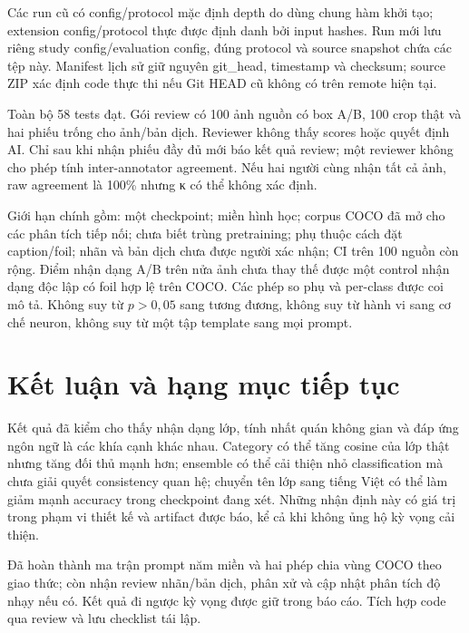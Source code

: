 \documentclass[11pt,a4paper]{article}
\begin{document}
Các run cũ có config/protocol mặc định depth do dùng chung hàm khởi tạo; extension config/protocol thực được định danh bởi input hashes. Run mới lưu riêng study config/evaluation config, đúng protocol và source snapshot chứa các tệp này. Manifest lịch sử giữ nguyên git\_head, timestamp và checksum; source ZIP xác định code thực thi nếu Git HEAD cũ không có trên remote hiện tại.

Toàn bộ 58 tests đạt. Gói review có 100 ảnh nguồn có box A/B, 100 crop thật và hai phiếu trống cho ảnh/bản dịch. Reviewer không thấy scores hoặc quyết định AI. Chỉ sau khi nhận phiếu đầy đủ mới báo kết quả review; một reviewer không cho phép tính inter-annotator agreement. Nếu hai người cùng nhận tất cả ảnh, raw agreement là 100\% nhưng κ có thể không xác định.

Giới hạn chính gồm: một checkpoint; miền hình học; corpus COCO đã mở cho các phân tích tiếp nối; chưa biết trùng pretraining; phụ thuộc cách đặt caption/foil; nhãn và bản dịch chưa được người xác nhận; CI trên 100 nguồn còn rộng. Điểm nhận dạng A/B trên nửa ảnh chưa thay thế được một control nhận dạng độc lập có foil hợp lệ trên COCO. Các phép so phụ và per-class được coi mô tả. Không suy từ $p>0,05$ sang tương đương, không suy từ hành vi sang cơ chế neuron, không suy từ một tập template sang mọi prompt.

\section{Kết luận và hạng mục tiếp tục}
Kết quả đã kiểm cho thấy nhận dạng lớp, tính nhất quán không gian và đáp ứng ngôn ngữ là các khía cạnh khác nhau. Category có thể tăng cosine của lớp thật nhưng tăng đối thủ mạnh hơn; ensemble có thể cải thiện nhỏ classification mà chưa giải quyết consistency quan hệ; chuyển tên lớp sang tiếng Việt có thể làm giảm mạnh accuracy trong checkpoint đang xét. Những nhận định này có giá trị trong phạm vi thiết kế và artifact được báo, kể cả khi không ủng hộ kỳ vọng cải thiện.

Đã hoàn thành ma trận prompt năm miền và hai phép chia vùng COCO theo giao thức; còn nhận review nhãn/bản dịch, phân xử và cập nhật phân tích độ nhạy nếu có. Kết quả đi ngược kỳ vọng được giữ trong báo cáo. Tích hợp code qua review và lưu checklist tái lập.
\end{document}
